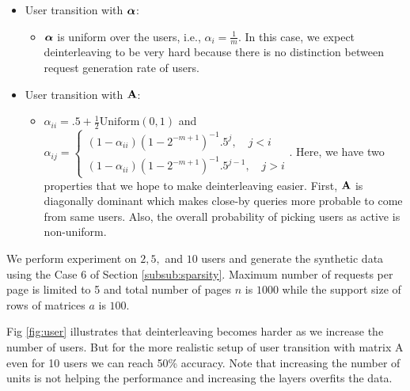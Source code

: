 \documentclass[conference]{IEEEtran}
\begin{document}
	\begin{itemize}
		\item User transition with $\boldsymbol{\alpha}$:
		\begin{itemize}
			\item $\boldsymbol{\alpha}$ is uniform over the users, i.e., $\alpha_i = \frac{1}{m}$. In this case, we expect deinterleaving to be very hard because there is no distinction between request generation rate of users. 
		\end{itemize}
		\item User transition with $\mathbf{A}$:
		\begin{itemize}
			\item $\alpha_{ii} = .5 + \frac{1}{2} \text{Uniform}(0,1)$ and $\alpha_{ij} = 
			\begin{cases}
			(1 - \alpha_{ii}) (1 - 2^{-m+1})^{-1} .5^j,     \quad j < i \\
			(1 - \alpha_{ii}) (1 - 2^{-m+1})^{-1} .5^{j-1}, \quad j > i
			\end{cases} 
			$. 
			Here, we have two properties that we hope to make deinterleaving easier. 
			First, $\mathbf{A}$ is diagonally dominant which makes close-by queries more probable to come from same users. 
			Also, the overall probability of picking users as active is non-uniform. 
		\end{itemize}
	\end{itemize} 
	We perform experiment on $2, 5,$ and $10$ users and generate the synthetic data using the Case 6 of Section \ref{subsub:sparsity}. 
	Maximum number of requests per page is limited to 5 and total number of pages $n$ is $1000$ while the support size of rows of matrices $a$ is $100$. 

	
	Fig \ref{fig:user} illustrates that deinterleaving becomes harder as we increase the number of users. 
	But for the more realistic setup of user transition with matrix A even for 10 users we can reach 50\% accuracy.
	Note that increasing the number of units is not helping the performance and increasing the layers overfits the data. 
	
\end{document}
